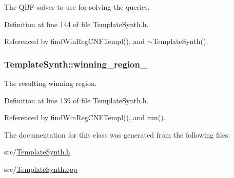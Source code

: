 The Q\-B\-F-\/solver to use for solving the queries. 



Definition at line 144 of file Template\-Synth.\-h.



Referenced by find\-Win\-Reg\-C\-N\-F\-Templ(), and $\sim$\-Template\-Synth().

\hypertarget{classTemplateSynth_a4e147629eae6a542dd87d72902df68c8}{
\subsubsection[{winning\-\_\-region\-\_\-}]{ Template\-Synth\-::winning\-\_\-region\-\_\-\hspace{0.3cm}{\ttfamily [protected]}}}\label{classTemplateSynth_a4e147629eae6a542dd87d72902df68c8}


The resulting winning region. 



Definition at line 139 of file Template\-Synth.\-h.



Referenced by find\-Win\-Reg\-C\-N\-F\-Templ(), and run().



The documentation for this class was generated from the following files\-:\begin{DoxyCompactItemize}
\item 
src/\hyperlink{TemplateSynth_8h}{Template\-Synth.\-h}\item 
src/\hyperlink{TemplateSynth_8cpp}{Template\-Synth.\-cpp}\end{DoxyCompactItemize}
